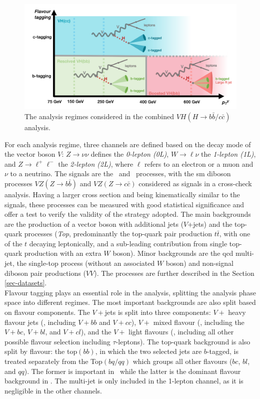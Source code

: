 \begin{figure}[h!]
\center
\includegraphics[width=\textwidth]{Images/VH/Cat/AnalysisRegime.png}
\caption{The analysis regimes considered in the combined $VH (H\rightarrow b\bar{b}/c\bar{c})$ analysis.} 
\label{fig:ana-strat}
\end{figure}

For each analysis regime, three channels are defined based on the decay mode of the vector boson $V$: $Z \rightarrow \nu \nu$ defines the \textit{0-lepton (0L)}, $W \rightarrow \ell \nu $ the \textit{1-lepton (1L)}, and $Z \rightarrow\ell^+\ell^-$ the \textit{2-lepton (2L)}, where $\ell$ refers to an electron or a muon and $\nu$ to a neutrino. The signals are the \vhb\ and \vhc\ processes, with the \gls{sm} diboson processes $VZ (Z\rightarrow b\bar{b})$ and $VZ (Z\rightarrow c\bar{c})$ considered as signals in a cross-check analysis. Having a larger cross section and being kinematically similar to the signals, these processes can be measured with good statistical significance and offer a test to verify the validity of the strategy adopted. The main backgrounds are the production of a vector boson with additional jets ($V$+jets) and the top-quark processes (\textit{Top}, predominantly the top-quark pair production $t\bar{t}$, with one of the $t$ decaying leptonically, and a sub-leading contribution from single top-quark production with an extra $W$ boson). Minor backgrounds are the \gls{qcd} multi-jet, the single-top process (without an associated $W$ boson) and non-signal diboson pair productions ($VV$). The processes are further described in the Section \ref{sec-datasets}. \\ 

Flavour tagging plays an essential role in the analysis, splitting the analysis phase space into different regimes. The most important backgrounds are also split based on flavour components. The $V+$jets is split into three components: $V+$ heavy flavour jets (\vhf, including $V+bb$ and $V+cc$), $V+$ mixed flavour (\vmf, including the $V+bc$, $V+bl$, and $V+cl$), and the $V+$ light flavours (\vlf, including all other possible flavour selection including $\tau$-leptons). The top-quark background is also split by flavour: the top$(bb)$, in which the two selected jets are $b$-tagged, is treated separately from the Top$(bq/qq)$ which groups all other flavours ($bc$, $bl$, and $qq$). The former is important in \vhb\ while the latter is the dominant flavour background in \vhc. The multi-jet is only included in the 1-lepton channel, as it is negligible in the other channels. \\

